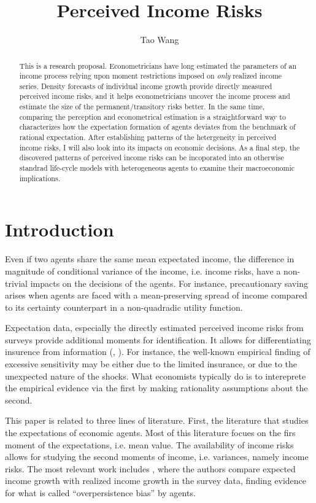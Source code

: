 \documentclass[]{article}
\title{Perceived Income Risks}
\author{Tao Wang}
\begin{document}
\maketitle

\begin{abstract}
This is a research proposal. Econometricians have long estimated the parameters of an income process relying upon moment restrictions imposed on \textit{only} realized income series.  Density forecasts of individual income growth provide directly measured perceived income risks, and it helps econometricians uncover the income process and estimate the size of the permanent/transitory risks better. In the same time, comparing the perception and econometrical estimation is a straightforward way to characterizes how the expectation formation of agents deviates from the benchmark of rational expectation. After establishing patterns of the hetergeneity in perceived income risks, I will also look into its impacts on economic decisions. As a final step, the discovered patterns of perceived income risks can be incoporated into an otherwise standrad life-cycle models with heterogeneous agents to examine their macroeconomic implications. 
 
\end{abstract}

\section{Introduction}


Even if two agents share the same mean expectated income, the difference in magnitude of conditional variance of the income, i.e. income risks, have a non-trivial impacts on the decisions of the agents. For instance, precautionary saving arises when agents are faced with a mean-preserving spread of income compared to its certainty counterpart in a non-quadradic utility function. 

Expectation data, especially the directly estimated perceived income risks from surveys provide additional moments for identification. It allows for differentiating insurence from information (\citet{kaufmann_disentangling_2009}, \citet{meghir_chapter_2011}). For instance, the well-known empirical finding of excessive sensitivity may be either due to the limited insurance, or due to the unexpected nature of the shocks. What economists typically do is to intereprete the empirical evidence via the first by making rationality assumptions about the second. 

This paper is related to three lines of literature. First, the literature that studies the expectations of economic agents. Most of this literature focues on the firs moment of the expectations, i.e. mean value. The availability of income risks allows for studying the second moments of income, i.e. variances, namely income risks. The most relevant work includes \citet{rozsypal2017overpersistence}, where the authors compare expected income growth with realized income growth in the survey data, finding evidence for what is called ``overpersistence bias'' by agents. 
\end{document}
